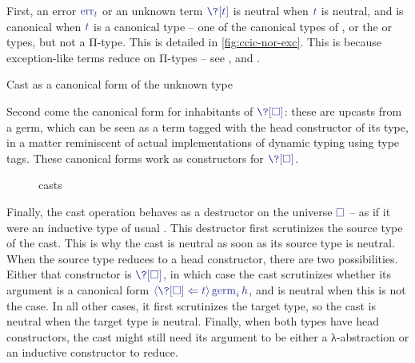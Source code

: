 First, an error $\tcol{\err[t]}$ or an unknown term $\tcol{\?[t]}$ is neutral when
$\tcol{t}$ is neutral,
and is canonical when $\tcol{t}$ is a canonical type – one of the canonical types of ,
or the  or  types, but not a Π-type.
This is detailed in \cref{fig:ccic-nor-exc}.
This is because exception-like terms reduce on Π-types – see ,
and .

\begin{marginfigure}
  \ContinuedFloat
  \begin{mathpar}
  \end{mathpar}
  \caption{Cast as a canonical form of the unknown type}
  \label{fig:ccic-cast-nor}
\end{marginfigure}

Second come the canonical form for inhabitants of $\tcol{\?[\uni]}$:
these are upcasts from a germ, which can be seen as a term tagged
with the head constructor of its type, in a matter reminiscent of
actual implementations of dynamic typing using type tags.
These canonical forms work as constructors for $\tcol{\?[\uni]}$.

\begin{figure}[h]
  \ContinuedFloat
  \caption{ casts}
  \label{fig:ccic-cast-neu}
\end{figure}

Finally, the cast operation behaves as a destructor on the
universe $\tcol{\uni}$ – as if it were an inductive type of usual .
This destructor first scrutinizes the source type of the cast.
This is why the cast is neutral as soon as its source type is neutral.
When the source type reduces to a head constructor, there are two
possibilities. Either that constructor is $\tcol{\?[\uni]}$, in which case the cast
scrutinizes whether its argument is a canonical form
$\tcol{\cast{t}{\?[\uni]}{\stalkCIC{i}{h}}}$, and is neutral when this is not the case.
In all other cases, it first scrutinizes the target type,
so the cast is neutral when the target type is neutral.
Finally, when both types have head constructors, the cast
might still need its argument to be either a λ-abstraction or an inductive
constructor to reduce.

